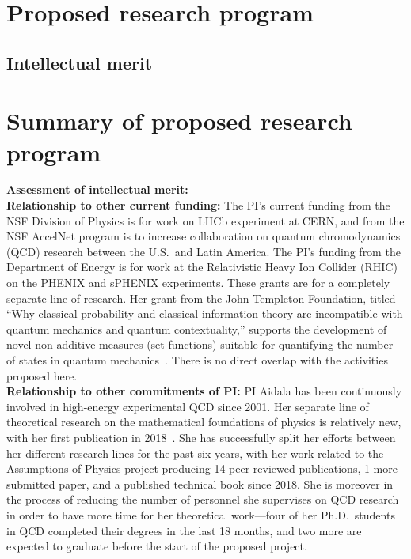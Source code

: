 \section{Proposed research program}

\subsection{Intellectual merit}



\section{Summary of proposed research program}


\noindent
\textbf{Assessment of intellectual merit:} \\

\noindent
\textbf{Relationship to other current funding:} The PI's current funding from the NSF Division of Physics is for work on LHCb experiment at CERN, and from the NSF AccelNet program is to increase collaboration on quantum chromodynamics (QCD) research between the U.S.~and Latin America.  The PI's funding from the Department of Energy is for work at the Relativistic Heavy Ion Collider (RHIC) on the PHENIX and sPHENIX experiments.  These grants are for a completely separate line of research. Her grant from the John Templeton Foundation, titled ``Why classical probability and classical information theory are incompatible with quantum mechanics and quantum contextuality,'' supports the development of novel non-additive measures (set functions) suitable for quantifying the number of states in quantum mechanics~\cite{aop-nonaddmeas}.  There is no direct overlap with the activities proposed here.  \\

\noindent
\textbf{Relationship to other commitments of PI:} PI Aidala has been continuously involved in high-energy experimental QCD since 2001.  Her separate line of theoretical research on the mathematical foundations of physics is relatively new, with her first publication in 2018~\cite{aop-phys-blueprint}. She has successfully split her efforts between her different research lines for the past six years, with her work related to the Assumptions of Physics project producing 14 peer-reviewed publications, 1 more submitted paper, and a published technical book since 2018.  She is moreover in the process of reducing the number of personnel she supervises on QCD research in order to have more time for her theoretical work---four of her Ph.D.~students in QCD completed their degrees in the last 18 months, and two more are expected to graduate before the start of the proposed project.  





